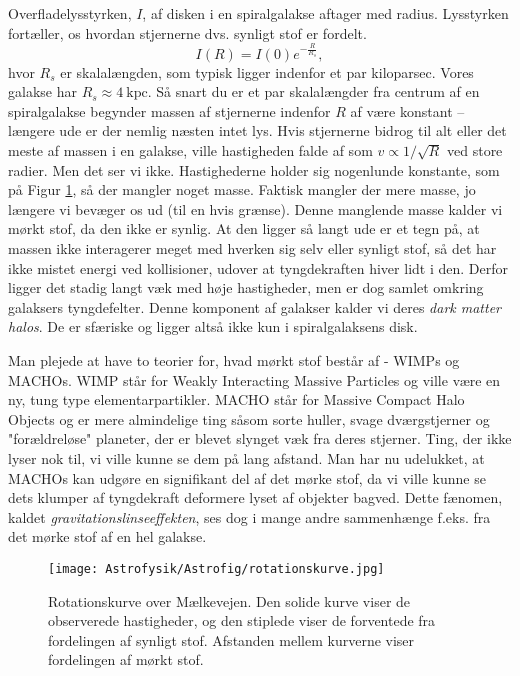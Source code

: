 Overfladelysstyrken, $I$, af disken i en spiralgalakse aftager med radius. Lysstyrken fortæller, os hvordan stjernerne dvs. synligt stof er fordelt.
\begin{equation}
I(R) = I(0) e^{-\frac{R}{R_s}},
\end{equation}
hvor $R_s$ er skalalængden, som typisk ligger indenfor et par kiloparsec. Vores galakse har $R_s\approx 4~\text{kpc}$. Så snart du er et par skalalængder fra centrum af en spiralgalakse begynder massen af stjernerne indenfor $R$ af være konstant -- længere ude er der nemlig næsten intet lys. Hvis stjernerne bidrog til alt eller det meste af massen i en galakse, ville hastigheden falde af som $v \propto 1/\sqrt{R}$ ved store radier. Men det ser vi ikke. Hastighederne holder sig nogenlunde konstante, som på Figur \ref{rotationskurve}, så der mangler noget masse. Faktisk mangler der mere masse, jo længere vi bevæger os ud (til en hvis grænse). Denne manglende masse kalder vi mørkt stof, da den ikke er synlig. At den ligger så langt ude er et tegn på, at massen ikke interagerer meget med hverken sig selv eller synligt stof, så det har ikke mistet energi ved kollisioner, udover at tyngdekraften hiver lidt i den. Derfor ligger det stadig langt væk med høje hastigheder, men er dog samlet omkring galaksers tyngdefelter. Denne komponent af galakser kalder vi deres \emph{dark matter halos}. De er sfæriske og ligger altså ikke kun i spiralgalaksens disk.

Man plejede at have to teorier for, hvad mørkt stof består af - WIMPs og MACHOs. WIMP står for Weakly Interacting Massive Particles og ville være en ny, tung type elementarpartikler. MACHO står for Massive Compact Halo Objects og er mere almindelige ting såsom sorte huller, svage dværgstjerner og "forældreløse" planeter, der er blevet slynget væk fra deres stjerner. Ting, der ikke lyser nok til, vi ville kunne se dem på lang afstand. Man har nu udelukket, at MACHOs kan udgøre en signifikant del af det mørke stof, da vi ville kunne se dets klumper af tyngdekraft deformere lyset af objekter bagved. Dette fænomen, kaldet \emph{gravitationslinseeffekten}, ses dog i mange andre sammenhænge f.eks. fra det mørke stof af en hel galakse. 

\begin{figure}[h!]
	\centering
	\texttt{[image: Astrofysik/Astrofig/rotationskurve.jpg]}
	\caption{Rotationskurve over Mælkevejen. Den solide kurve viser de observerede hastigheder, og den stiplede viser de forventede fra fordelingen af synligt stof. Afstanden mellem kurverne viser fordelingen af mørkt stof. 
		}
	\label{rotationskurve}
\end{figure}

